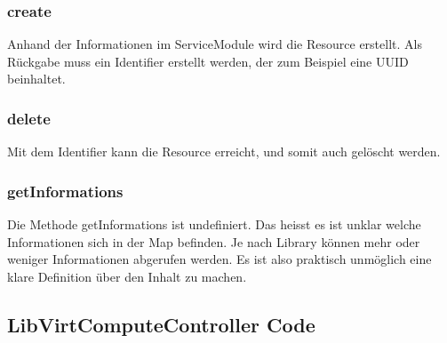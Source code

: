 \subsubsection{create}
Anhand der Informationen im ServiceModule wird die Resource erstellt. Als Rückgabe muss ein Identifier erstellt werden, der zum Beispiel eine UUID beinhaltet.

\subsubsection{delete}
Mit dem Identifier kann die Resource erreicht, und somit auch gelöscht werden.

\subsubsection{getInformations}
Die Methode getInformations ist undefiniert. Das heisst es ist unklar welche Informationen sich in der Map befinden. Je nach Library können mehr oder weniger Informationen abgerufen werden. 
Es ist also praktisch unmöglich eine klare Definition über den Inhalt zu machen.

\subsection{LibVirtComputeController Code}


